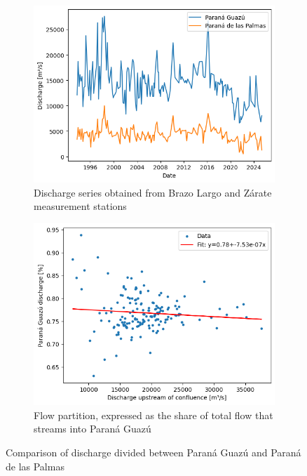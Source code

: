 \begin{figure}[h!]
    \centering
    \begin{subfigure}[b]{0.48\linewidth}
        \centering
        \includegraphics[width=\linewidth]{figures/ch5/discharge series.png}
        \caption{Discharge series obtained from Brazo Largo and Zárate measurement stations}
        \label{fig:discharge_series}
    \end{subfigure}
    \hfill
    \begin{subfigure}[b]{0.48\linewidth}
        \centering
        \includegraphics[width=\linewidth]{figures/ch5/flow partition.png}
        \caption{Flow partition, expressed as the share of total flow that streams into Paraná Guazú}
        \label{fig:flow_partition}
    \end{subfigure}
    
    \caption{Comparison of discharge divided between Paraná Guazú and Paraná de las Palmas}
\end{figure}



